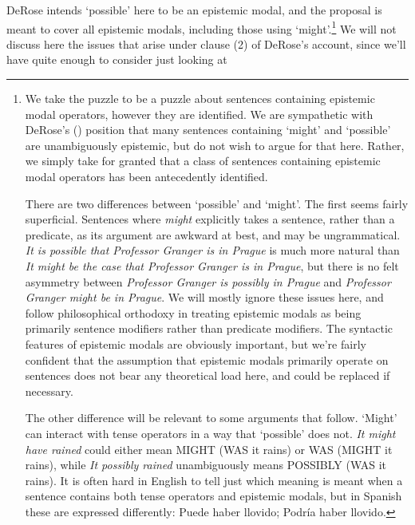 \documentclass[
  11pt,
  letterpaper,
  DIV=11,
  numbers=noendperiod,
  twoside]{scrartcl}
\begin{document}
DeRose intends `possible' here to be an epistemic modal, and the
proposal is meant to cover all epistemic modals, including those using
`might'.\footnote{We take the puzzle to be a puzzle about sentences
  containing epistemic modal operators, however they are identified. We
  are sympathetic with DeRose's ()
  position that many sentences containing `might' and `possible' are
  unambiguously epistemic, but do not wish to argue for that here.
  Rather, we simply take for granted that a class of sentences
  containing epistemic modal operators has been antecedently identified.

  There are two differences between `possible' and `might'. The first
  seems fairly superficial. Sentences where \emph{might} explicitly
  takes a sentence, rather than a predicate, as its argument are awkward
  at best, and may be ungrammatical. \emph{It is possible that Professor
  Granger is in Prague} is much more natural than \emph{It might be the
  case that Professor Granger is in Prague}, but there is no felt
  asymmetry between \emph{Professor Granger is possibly in Prague} and
  \emph{Professor Granger might be in Prague}. We will mostly ignore
  these issues here, and follow philosophical orthodoxy in treating
  epistemic modals as being primarily sentence modifiers rather than
  predicate modifiers. The syntactic features of epistemic modals are
  obviously important, but we're fairly confident that the assumption
  that epistemic modals primarily operate on sentences does not bear any
  theoretical load here, and could be replaced if necessary.

  The other difference will be relevant to some arguments that follow.
  `Might' can interact with tense operators in a way that `possible'
  does not. \emph{It might have rained} could either mean MIGHT (WAS it
  rains) or WAS (MIGHT it rains), while \emph{It possibly rained}
  unambiguously means POSSIBLY (WAS it rains). It is often hard in
  English to tell just which meaning is meant when a sentence contains
  both tense operators and epistemic modals, but in Spanish these are
  expressed differently: Puede haber llovido; Podría haber llovido.} We
will not discuss here the issues that arise under clause (2) of DeRose's
account, since we'll have quite enough to consider just looking at
\end{document}

